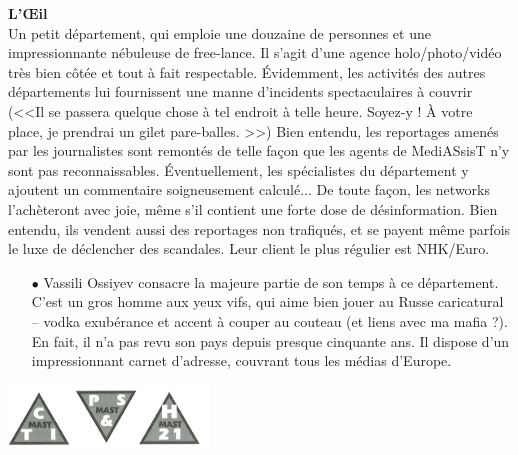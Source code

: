 \documentclass[11pt,twoside,a4paper]{article}
\begin{document}
\begin{multicols}{2}
\textbf{\large L'\OE il}~\\
Un petit d{\'e}partement, qui emploie une douzaine de personnes et une impressionnante n{\'e}buleuse de free-lance. Il s'agit d'une agence holo/photo/vid{\'e}o tr{\`e}s bien c{\^o}t{\'e}e et tout {\`a} fait respectable. {\'E}videmment, les activit{\'e}s des autres d{\'e}partements lui fournissent une manne d'incidents spectaculaires {\`a} couvrir (<<Il se passera quelque chose {\`a} tel endroit {\`a} telle heure. Soyez-y ! {\`A} votre place, je prendrai un gilet pare-balles. >>) Bien entendu, les reportages amen{\'e}s par les journalistes sont remont{\'e}s de telle fa\c{c}on que les agents de MediASsisT n'y sont pas reconnaissables. {\'E}ventuellement, les sp{\'e}cialistes du d{\'e}partement y ajoutent un commentaire soigneusement calcul{\'e}... De toute fa\c{c}on, les networks l'ach{\`e}teront avec joie, m{\^e}me s'il contient une forte dose de d{\'e}sinformation. Bien entendu, ils vendent aussi des reportages non trafiqu{\'e}s, et se payent m{\^e}me parfois le luxe de d{\'e}clencher des scandales. Leur client le plus r{\'e}gulier est NHK/Euro. 
\begin{itemize}
	\item[$\bullet$] Vassili Ossiyev consacre la majeure partie de son temps {\`a} ce d{\'e}partement. C'est un gros homme aux yeux vifs, qui aime bien jouer au Russe caricatural -- vodka exub{\'e}rance et accent {\`a} couper au couteau (et liens avec ma mafia ?). En fait, il n'a pas revu son pays depuis presque cinquante ans. Il dispose d'un impressionnant carnet d'adresse, couvrant tous les m{\'e}dias d'Europe. 
\end{itemize} %

\begin{center} \includegraphics[width=0.40\textwidth]{img/MASTlogosSections.jpg} \end{center}


\end{multicols}
\end{document}
